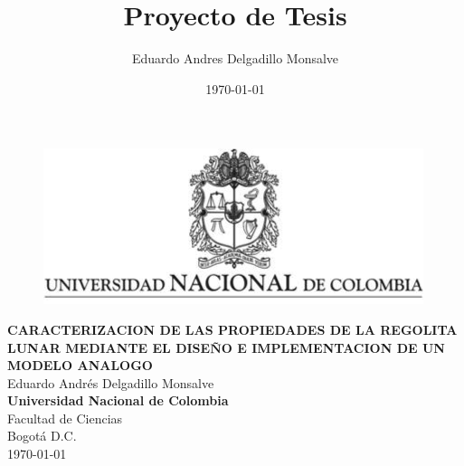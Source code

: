 \documentclass[12pt]{article}
\title{Proyecto de Tesis}
\author{Eduardo Andres Delgadillo Monsalve}
\date{\today}
\begin{document}
\renewcommand{\tablename}{Tabla}%
\renewcommand{\listtablename}{Índice de tablas}
\begin{titlepage}
    \centering
    \thispagestyle{empty}
    \begin{center}
        \begin{figure}
        \centering%
        \includegraphics{images/EscudoUN.png}
    \end{figure}
    
    \vspace{3cm}
    
        \textbf{CARACTERIZACION DE LAS PROPIEDADES DE LA REGOLITA LUNAR MEDIANTE EL DISEÑO E IMPLEMENTACION DE UN MODELO ANALOGO}\\[2in]
    Eduardo Andrés Delgadillo Monsalve \\  [3in]

   \textbf{Universidad Nacional de Colombia}\\
   Facultad de Ciencias\\
   Bogotá D.C.\\
   \today
    \end{center}
\end{titlepage}
\end{document}
